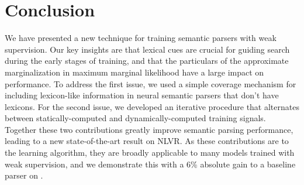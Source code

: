 \section{Conclusion}
We have presented a new technique for training semantic parsers with weak supervision.  Our key insights are that lexical cues are crucial for guiding search during the early stages of training, and that the particulars of the approximate marginalization in maximum marginal likelihood have a large impact on performance.  To address the first issue, we used a simple coverage mechanism for including lexicon-like information in neural semantic parsers that don't have lexicons.  For the second issue, we developed an iterative procedure that alternates between statically-computed and dynamically-computed training signals.  Together these two contributions greatly improve semantic parsing performance, leading to a new state-of-the-art result on NLVR.  As these contributions are to the learning algorithm, they are broadly applicable to many models trained with weak supervision, and we demonstrate this with a 6\% absolute gain to a baseline parser on \WTQ{}.
